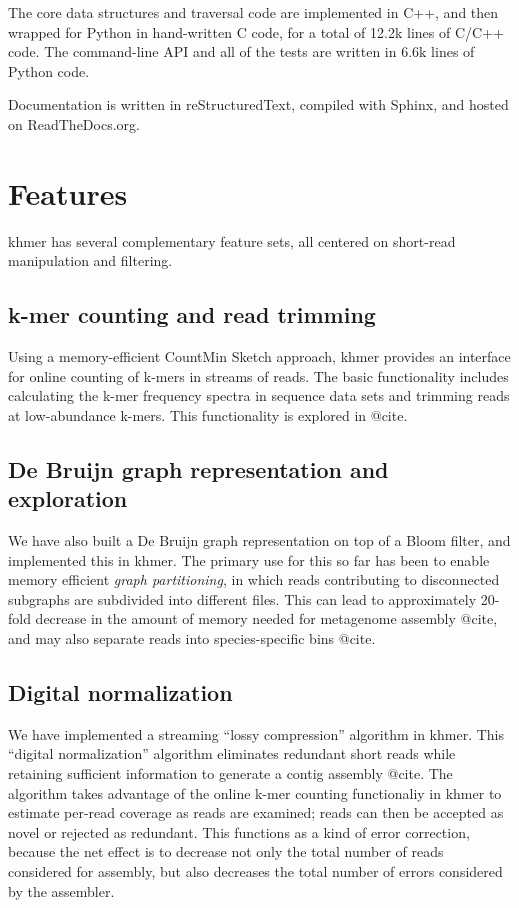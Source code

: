 \documentclass[10pt]{article}
\begin{document}
The core data structures and traversal code are implemented in C++, and
then wrapped for Python in hand-written C code, for a total of
12.2k lines of C/C++ code.  The command-line API and all of the tests
are written in 6.6k lines of Python code.

Documentation is written in reStructuredText, compiled with Sphinx, and
hosted on ReadTheDocs.org.

\section*{Features}

khmer has several complementary feature sets, all centered on short-read
manipulation and filtering.

\subsection*{k-mer counting and read trimming}

Using a memory-efficient CountMin Sketch approach, khmer provides an
interface for online counting of k-mers in streams of reads.  The
basic functionality includes calculating the k-mer frequency spectra
in sequence data sets and trimming reads at low-abundance k-mers.
This functionality is explored in @cite.

\subsection*{De Bruijn graph representation and exploration}

We have also built a De Bruijn graph representation on top of a Bloom
filter, and implemented this in khmer.  The primary use for this so far
has been to enable memory efficient {\em graph partitioning}, in which
reads contributing to disconnected subgraphs are subdivided into different
files.  This can lead to approximately 20-fold decrease in the amount of
memory needed for metagenome assembly @cite, and may also separate reads
into species-specific bins @cite.

\subsection*{Digital normalization}

We have implemented a streaming ``lossy compression'' algorithm in
khmer.  This ``digital normalization'' algorithm eliminates redundant
short reads while retaining sufficient information to generate a
contig assembly @cite.  The algorithm takes advantage of the online
k-mer counting functionaliy in khmer to estimate per-read coverage as
reads are examined; reads can then be accepted as novel or rejected as
redundant. This functions as a kind of error correction, because the
net effect is to decrease not only the total number of reads considered
for assembly, but also decreases the total number of errors considered
by the assembler.
\end{document}
